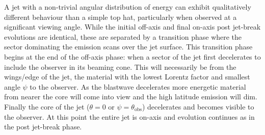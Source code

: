 \documentclass[modern]{aastex62}
\newcommand{\thobs}{\ensuremath{\theta_{\mathrm{obs}}}}
\begin{document}
A jet with a non-trivial angular distribution of energy can exhibit qualitatively different behaviour than a simple top hat, particularly when observed at a significant viewing angle.  While the initial off-axis and final on-axis post jet-break evolutions are identical, these are separated by a transition phase where the sector dominating the emission scans over the jet surface.  This transition phase begins at the end of the off-axis phase: when a sector of the jet first decelerates to include the observer in its beaming cone.  This will necessarily be from the wings/edge of the jet, the material with the lowest Lorentz factor and smallest angle $\psi$ to the observer.  As the blastwave decelerates more energetic material from nearer the core will come into view and the high latitude emission will dim.  Finally the core of the jet ($\theta = 0$ or $\psi = \thobs$) decelerates and becomes visible to the observer.  At this point the entire jet is on-axis and evolution continues as in the post jet-break phase.
\end{document}
